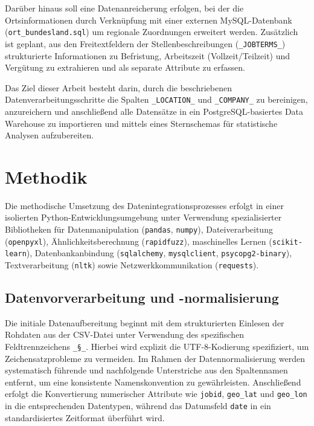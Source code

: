 \documentclass[
    a4paper,
    12pt,
    headinclude=true,
    BCOR=10mm,
]{scrreprt}
\begin{document}
Darüber hinaus soll eine Datenanreicherung erfolgen, bei der die Ortsinformationen durch Verknüpfung mit einer externen MySQL-Datenbank (\texttt{ort\_bundesland.sql}) um regionale Zuordnungen erweitert werden. Zusätzlich ist geplant, aus den Freitextfeldern der Stellenbeschreibungen (\texttt{\_JOBTERMS\_}) strukturierte Informationen zu Befristung, Arbeitszeit (Vollzeit/Teilzeit) und Vergütung zu extrahieren und als separate Attribute zu erfassen.

Das Ziel dieser Arbeit besteht darin, durch die beschriebenen Datenverarbeitungsschritte die Spalten \texttt{\_LOCATION\_} und  \texttt{\_COMPANY\_} zu bereinigen, anzureichern und anschließend alle Datensätze in ein PostgreSQL-basiertes Data Warehouse zu importieren und mittels eines Sternschemas für statistische Analysen aufzubereiten.


\chapter{Methodik}

Die methodische Umsetzung des Datenintegrationsprozesses erfolgt in einer isolierten Python-Entwicklungsumgebung unter Verwendung spezialisierter Bibliotheken für Datenmanipulation (\texttt{pandas}, \texttt{numpy}), Dateiverarbeitung (\texttt{openpyxl}), Ähnlichkeitsberechnung (\texttt{rapidfuzz}), maschinelles Lernen (\texttt{scikit-learn}), Datenbankanbindung (\texttt{sqlalchemy}, \texttt{mysqlclient}, \texttt{psycopg2-binary}), Textverarbeitung (\texttt{nltk}) sowie Netzwerkkommunikation (\texttt{requests}).

\section{Datenvorverarbeitung und -normalisierung}

Die initiale Datenaufbereitung beginnt mit dem strukturierten Einlesen der Rohdaten aus der CSV-Datei unter Verwendung des spezifischen Feldtrennzeichens \texttt{\_§\_}. Hierbei wird explizit die UTF-8-Kodierung spezifiziert, um Zeichensatzprobleme zu vermeiden. Im Rahmen der Datennormalisierung werden systematisch führende und nachfolgende Unterstriche aus den Spaltennamen entfernt, um eine konsistente Namenskonvention zu gewährleisten. Anschließend erfolgt die Konvertierung numerischer Attribute wie \texttt{jobid}, \texttt{geo\_lat} und \texttt{geo\_lon} in die entsprechenden Datentypen, während das Datumsfeld \texttt{date} in ein standardisiertes Zeitformat überführt wird.
\end{document}
